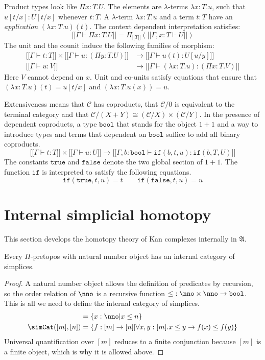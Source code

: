 \documentclass{tac}
\newcommand\cat\mathcal
\newcommand\set[1]{\left\{#1\right\}}
\newcommand\of{:}
\newcommand\db[1]{{[\![}#1{]\!]}}
\newcommand\dprod{\Pi_}
\newcommand\true{\mathtt{true}}
\newcommand\false{\mathtt{false}}
\newcommand\bool{\mathtt{bool}}
\newcommand\ttif{\mathtt{if}}
\newcommand\ambient{\mathfrak A}
\begin{document}
Product types look like $\Pi x\of T.U$. The elements are $\lambda$-terms $\lambda x\of T.u$, such that $u[t/x]\of U[t/x]$ whenever $t\of T$. A $\lambda$-term $\lambda x\of T.u$ and a term $t\of T$ have an \emph{application} $(\lambda x\of T.u)(t)$. The context dependent interpretation satisfies:
\[ \db{\Gamma\vdash\Pi x\of T.U} = \dprod {\db T}(\db{\Gamma,x\of T\vdash U}) \]
The unit and the counit induce the following families of morphism:
\begin{align*}
\db{\Gamma\vdash t\of T}\times\db{\Gamma\vdash u\of(\Pi y\of T.U)}&\to\db{\Gamma\vdash u(t)\of U[u/y]}\\
\db{\Gamma\vdash u\of V}&\to\db{\Gamma\vdash (\lambda x\of T.u)\of(\Pi x\of T.V)}
\end{align*}
Here $V$ cannot depend on $x$. Unit and co-units satisfy equations that ensure that $(\lambda x\of T.u)(t) = u[t/x]$ and $(\lambda x\of T.u(x))=u$.

Extensiveness means that $\cat C$ has coproducts, that $\cat C/0$ is equivalent to the terminal category and that $\cat C/(X+Y)\cong (\cat C/X)\times(\cat C/Y)$. In the presence of dependent coproducts, a type $\bool$ that stands for the object $1+1$ and a way to introduce types and terms that dependent on $\bool$ suffice to add all binary coproducts.
\[ \db{\Gamma\vdash t\of T}\times\db{\Gamma\vdash u\of U}\to\db{\Gamma,b\of\bool\vdash \ttif(b,t,u)\of\ttif(b,T,U)} \]
The constants $\true$ and $\false$ denote the two global section of $1+1$. The function $\ttif$ is interpreted to satisfy the following equations.
\[ \ttif(\true,t,u)=t\qquad\ttif(\false,t,u) = u\]


\section{Internal simplicial homotopy}
This section develops the homotopy theory of Kan complexes internally in $\ambient$.

\begin{proposition} Every $\Pi$-pretopos with natural number object has an internal category of simplices.\end{proposition}

\begin{proof} A natural number object allows the definition of predicates by recursion, so the order relation of $\nno$ is a recursive function $\mathord\leq\of\nno\times \nno \to \bool$. This is all we need to define the internal category of simplices.
\begin{align*}
[n] &= \set{x\of\nno\middle| x\leq n}\\
\simCat([m],[n]) &= \set{f\of[m]\to[n]\middle|\forall x,y\of [m].x\leq y\to f(x)\leq f(y)}
\end{align*}
Universal quantification over $[m]$ reduces to a finite conjunction because $[m]$ is a finite object, which is why it is allowed above. 
\end{proof}
\end{document}
